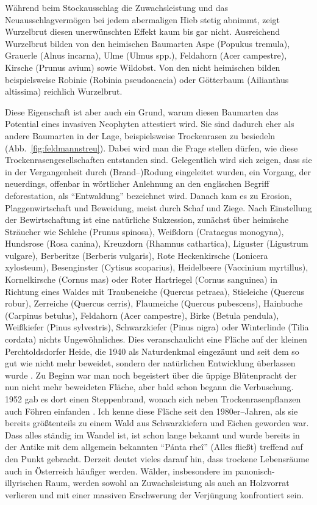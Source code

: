 \documentclass[twocolumn]{scrartcl}
\begin{document}
Während beim Stockausschlag die Zuwachsleistung und das Neuausschlagvermögen bei
jedem abermaligen Hieb stetig abnimmt, zeigt Wurzelbrut diesen unerwünschten
Effekt kaum bis gar nicht. Ausreichend Wurzelbrut bilden von den heimischen
Baumarten Aspe (Popukus tremula), Grauerle (Alnus incarna), Ulme (Ulmus spp.),
Feldahorn (Acer campestre), Kirsche (Prunus avium) sowie Wildobst. Von den nicht
heimischen bilden beispielsweise Robinie (Robinia pseudoacacia) oder Götterbaum
(Ailianthus altissima) reichlich Wurzelbrut.

Diese Eigenschaft ist aber auch ein Grund, warum diesen Baumarten das
Potential eines invasiven Neophyten attestiert wird. Sie sind dadurch
eher als andere Baumarten in der Lage, beispielsweise Trockenrasen zu
besiedeln (Abb.~\ref{fig:feldmannstreu}). Dabei wird man die Frage
stellen dürfen, wie diese Trockenrasengesellschaften entstanden sind.
Gelegentlich wird sich zeigen, dass sie in der Vergangenheit durch
(Brand\mbox{--)}Rodung eingeleitet wurden, ein Vorgang, der
neuerdings, offenbar in wörtlicher Anlehnung an den englischen Begriff
deforestation, als \enquote{Entwaldung} bezeichnet wird. Danach kam es
zu Erosion, Plaggenwirtschaft und Beweidung, meist durch Schaf und
Ziege. Nach Einstellung der Bewirtschaftung ist eine natürliche
Sukzession, zunächst über heimische Sträucher wie Schlehe (Prunus
spinosa), Weißdorn (Crataegus monogyna), Hundsrose (Rosa canina),
Kreuzdorn (Rhamnus cathartica), Liguster (Ligustrum vulgare),
Berberitze (Berberis vulgaris), Rote Heckenkirsche (Lonicera
xylosteum), Besenginster (Cytisus scoparius), Heidelbeere (Vaccinium
myrtillus), Kornelkirsche (Cornus mas) oder Roter Hartriegel (Cornus
sanguinea) in Richtung eines Waldes mit Traubeneiche (Quercus
petraea), Stieleiche (Quercus robur), Zerreiche (Quercus cerris),
Flaumeiche (Quercus pubescens), Hainbuche (Carpinus betulus),
Feldahorn (Acer campestre), Birke (Betula pendula), Weißkiefer (Pinus
sylvestris), Schwarzkiefer (Pinus nigra) oder Winterlinde (Tilia
cordata) nichts Ungewöhnliches. Dies veranschaulicht eine Fläche auf
der kleinen Perchtoldsdorfer Heide, die 1940 als Naturdenkmal
eingezäunt und seit dem so gut wie nicht mehr beweidet, sondern der
natürlichen Entwicklung überlassen wurde
\citep{rosenkranz1953heide}. Zu Beginn war man noch begeistert über
die üppige Blütenpracht der nun nicht mehr beweideten Fläche, aber
bald schon begann die Verbuschung. 1952 gab es dort einen
Steppenbrand, wonach sich neben Trockenrasenpflanzen auch Föhren
einfanden \citep{rosenkranz1953heideBrand}. Ich kenne diese Fläche
seit den 1980er--Jahren, als sie bereits größtenteils zu einem Wald
aus Schwarzkiefern und Eichen geworden war.
Dass alles ständig im Wandel ist, ist schon lange bekannt und wurde
bereits in der Antike mit dem allgemein bekannten \enquote{Pánta rheî}
(Alles fließt) treffend auf den Punkt gebracht.
Derzeit deutet vieles darauf hin, dass trockene Lebensräume auch in
Österreich häufiger werden. Wälder, insbesondere im
panonisch-illyrischen Raum, werden sowohl an Zuwachsleistung als auch
an Holzvorrat verlieren und mit einer massiven Erschwerung der
Verjüngung konfrontiert sein.
\end{document}
